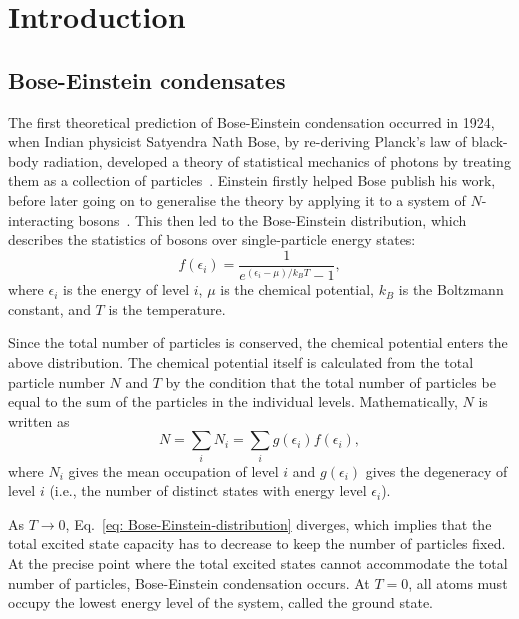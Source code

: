 \chapter{Introduction}


\section{Bose-Einstein condensates}
The first theoretical prediction of Bose-Einstein condensation occurred in 1924,
when Indian physicist Satyendra Nath Bose, by re-deriving Planck's law of
black-body radiation, developed a theory of statistical mechanics of photons
by treating them as a collection of particles~\cite{Bose1924}.
Einstein firstly helped Bose publish his work, before later going on to
generalise the theory by applying it to a system of \(N\)-interacting
bosons~\cite{Einstein1925}.
This then led to the Bose-Einstein distribution, which describes the
statistics of bosons over single-particle energy states:
\begin{equation}\label{eq: Bose-Einstein-distribution}
    f(\epsilon_i) = \frac{1}{e^{(\epsilon_i-\mu)/k_B T} - 1},
\end{equation}
where \(\epsilon_i\) is the energy of level \(i\), \(\mu \) is the chemical
potential, \(k_B\) is the Boltzmann constant, and \(T\) is the temperature.

Since the total number of particles is conserved, the chemical potential enters
the above distribution.
The chemical potential itself is calculated from the total particle number \(N\)
and \(T\) by the condition that the total number of particles be equal to the
sum of the particles in the individual levels.
Mathematically, \(N\) is written as
\begin{equation}
    N = \sum_i N_i = \sum_i g(\epsilon_i)f(\epsilon_i),
\end{equation}
where \(N_i\) gives the mean occupation of level \(i\) and \(g(\epsilon_i)\)
gives the degeneracy of level \(i\) (i.e., the number of distinct states with
energy level \(\epsilon_i\)).

As \(T \rightarrow 0\), Eq.~\eqref{eq: Bose-Einstein-distribution} diverges,
which implies that the total excited state capacity has to decrease to keep
the number of particles fixed.
At the precise point where the total excited states cannot accommodate the total
number of particles, Bose-Einstein condensation occurs.
At \(T=0\), all atoms must occupy the lowest energy level of the system, called
the ground state.

